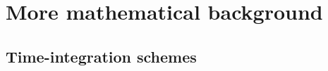 \chapter{More mathematical background}\label{app: math background}
\section{Time-integration schemes}\label{sec: time integration}
